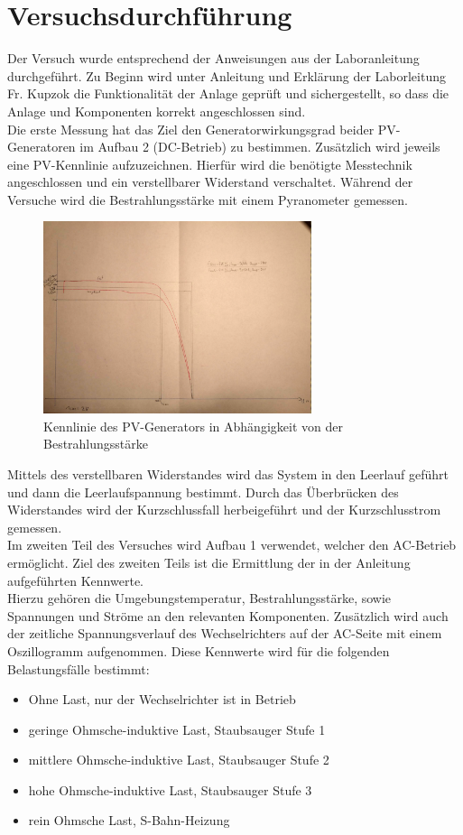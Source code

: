 \newpage
\section{Versuchsdurchführung}
Der Versuch wurde entsprechend der Anweisungen aus der Laboranleitung \cite{Laboranleitung} durchgeführt.
Zu Beginn wird unter Anleitung und Erklärung der Laborleitung Fr. Kupzok die
Funktionalität der Anlage geprüft und sichergestellt, so dass die Anlage und Komponenten korrekt angeschlossen sind.\\
Die erste Messung hat das Ziel den Generatorwirkungsgrad beider PV-Generatoren im Aufbau 2 (DC-Betrieb) zu bestimmen.
Zusätzlich wird jeweils eine PV-Kennlinie aufzuzeichnen. Hierfür wird die benötigte Messtechnik angeschlossen und ein verstellbarer Widerstand verschaltet.
Während der Versuche wird die Bestrahlungsstärke mit einem Pyranometer gemessen.\\
\begin{figure}[!ht]
		\centering
		\includegraphics[width=0.7\textwidth]{Abbildungen/Kennlinie_PVGEN}
		\caption{Kennlinie des PV-Generators in Abhängigkeit von der Bestrahlungsstärke}
		\label{fig:230514_PVGEN_Kennlinie}
\end{figure}

Mittels des verstellbaren Widerstandes wird das System in den Leerlauf geführt und dann die Leerlaufspannung bestimmt.
Durch das Überbrücken des Widerstandes wird der Kurzschlussfall herbeigeführt und der Kurzschlusstrom gemessen.\\
Im zweiten Teil des Versuches wird Aufbau 1 verwendet, welcher den AC-Betrieb ermöglicht.
Ziel des zweiten Teils ist die Ermittlung der in der Anleitung \cite[S.8]{Laboranleitung} aufgeführten Kennwerte.\\
Hierzu gehören die Umgebungstemperatur, Bestrahlungsstärke, sowie Spannungen und Ströme an den relevanten Komponenten.
Zusätzlich wird auch der zeitliche Spannungsverlauf des Wechselrichters auf der AC-Seite mit einem Oszillogramm aufgenommen.
Diese Kennwerte wird für die folgenden Belastungsfälle bestimmt:
\begin{itemize}
    \item Ohne Last, nur der Wechselrichter ist in Betrieb
    \item geringe Ohmsche-induktive Last, Staubsauger Stufe 1
    \item mittlere Ohmsche-induktive Last, Staubsauger Stufe 2
    \item hohe Ohmsche-induktive Last, Staubsauger Stufe 3
    \item rein Ohmsche Last, S-Bahn-Heizung
\end{itemize}